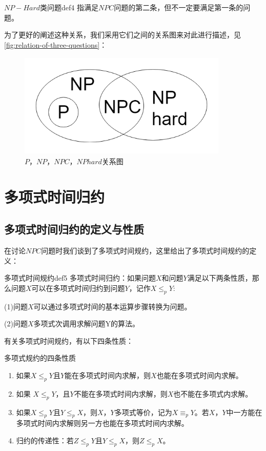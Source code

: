 	\begin{definition}{$NP-Hard$类问题}{def4}
		指满足$NPC$问题的第二条，但不一定要满足第一条的问题。
	\end{definition}
	
	为了更好的阐述这种关系，我们采用它们之间的关系图来对此进行描述，见\autoref{fig:relation-of-three-questions}：
	
	\begin{figure}[h]
		\begin{minipage}[t]{1\linewidth}
			\centering
			\includegraphics[width=10cm,height=5cm]{image/P_NP1.png}
			\caption{$P$，$NP$，$NPC$，$NPhard$关系图}\label{fig:relation-of-three-questions}
		\end{minipage}
	\end{figure}
	
	\section{多项式时间归约}
	\subsection{多项式时间归约的定义与性质}
	在讨论$NPC$问题时我们谈到了多项式时间规约，这里给出了多项式时间规约的定义：
	\begin{definition}{多项式时间规约}{def5}
	多项式时间归约：如果问题$X$和问题$Y$满足以下两条性质，那么问题$X$可以在多项式时间归约到问题$Y$，记作$X\leq_pY$:
		
	(1)问题$X$可以通过多项式时间的基本运算步骤转换为问题。
	
	(2)问题$X$多项式次调用求解问题Y的算法。
	\end{definition}
	有关多项式时间规约，有以下四条性质：
	\begin{theorem}{多项式规约的四条性质}{}	
		\begin{enumerate}
			\item 如果$X\leq_pY$且$Y$能在多项式时间内求解，则$X$也能在多项式时间内求解。
			\item 如果 $X\leq_pY$，且$Y$不能在多项式时间内求解，则$X$也不能在多项式内求解。
			\item 如果$X\leq_pY$且$Y\leq_pX$，则$X$，$Y$多项式等价，记为$X\equiv_pY$。若$X$，$Y$中一方能在多项式时间内求解则另一方也能在多项式时间内求解。
			\item 归约的传递性：若$Z\leq_pY$且$Y\leq_pX$，则$Z\leq_pX$。
		\end{enumerate}
		
	\end{theorem}

